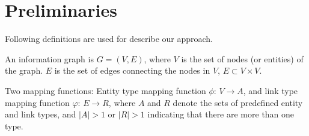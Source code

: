 


\section{Preliminaries}\label{3PD}
Following definitions are used for describe our approach.

\begin{definition}
An information graph is $G = (V,E)$, where $V$ is the set of nodes (or entities) of the graph. $E$ is the set of edges connecting the nodes in $V$, $E \subset V \times V$.

Two mapping functions: Entity type mapping function $\phi$: $V \rightarrow A$, and link type mapping function $\varphi$: $E \rightarrow R$, where $A$ and $R$ denote the sets of predefined entity and link types, and $|A| > 1$ or $|R| > 1$ indicating that there are more than one type.
\end{definition}

